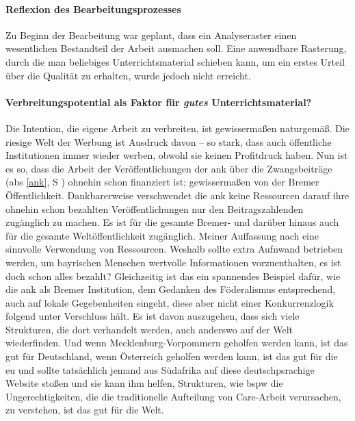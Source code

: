 \paragraph{Reflexion des Bearbeitungsprozesses}
Zu Beginn der Bearbeitung war geplant, dass ein Analyseraster einen wesentlichen Bestandteil der Arbeit ausmachen soll. 
Eine anwendbare Rasterung, durch die man beliebiges Unterrichtsmaterial schieben kann, um ein erstes Urteil über die Qualität zu erhalten, wurde jedoch nicht erreicht. 



\paragraph{Verbreitungspotential als Faktor für \emph{gutes} Unterrichtsmaterial?}
Die Intention, die eigene Arbeit zu verbreiten, ist gewissermaßen naturgemäß. Die riesige Welt der Werbung ist Ausdruck davon -- so stark, dass auch öffentliche Institutionen immer wieder werben, obwohl sie keinen Profitdruck haben. 
Nun ist es so, dass die Arbeit der Veröffentlichungen der \gls{ank} über die Zwangsbeiträge (\gls{abs} \ref{ank}, \gls{S} \pageref{ank}) ohnehin schon finanziert ist; gewissermaßen von der Bremer Öffentlichkeit. Dankbarerweise verschwendet die \gls{ank} keine Ressourcen darauf ihre ohnehin schon bezahlten Veröffentlichungen nur den Beitragszahlenden zugänglich zu machen. Es ist für die gesamte Bremer- und darüber hinaus auch für die gesamte Weltöffentlichkeit zugänglich. Meiner Auffassung nach eine sinnvolle Verwendung von Ressourcen. Weshalb sollte extra Aufnwand betrieben werden, um bayrischen Menschen wertvolle Informationen vorzuenthalten, es ist doch schon alles bezahlt? 
Gleichzeitig ist das ein spannendes Beispiel dafür, wie die \gls{ank} als Bremer Institution, dem Gedanken des Föderalismus entsprechend, auch auf lokale Gegebenheiten eingeht, diese aber nicht einer Konkurrenzlogik folgend unter Verschluss hält. Es ist davon auszugehen, dass sich viele Strukturen, die dort verhandelt werden, auch anderswo auf der Welt wiederfinden. Und wenn Mecklenburg-Vorpommern geholfen werden kann, ist das gut für Deutschland, wenn Österreich geholfen werden kann, ist das gut für die \gls{eu} und sollte tatsächlich jemand aus Südafrika auf diese deutschpsrachige Website stoßen und sie kann ihm helfen, Strukturen, wie \gls{bspw} die Ungerechtigkeiten, die die traditionelle Aufteilung von Care-Arbeit verursachen, zu verstehen, ist das gut für die Welt. 

